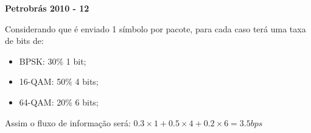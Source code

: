 \textbf{Petrobrás 2010 - 12}

Considerando que é enviado 1 símbolo por pacote, para cada caso terá uma taxa de bits de:

\begin{itemize}
    \item BPSK: 30\% 1 bit;
    \item 16-QAM: 50\% 4 bits;
    \item 64-QAM: 20\% 6 bits;
\end{itemize}

Assim o fluxo de informação será: $0.3 \times 1 + 0.5 \times 4 + 0.2 \times 6 = 3.5 bps$